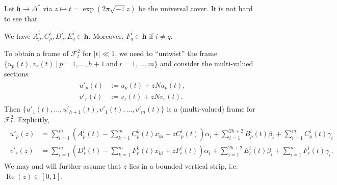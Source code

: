 Let \(\mathfrak{h}\to \Delta^{\ast}\) via \(z\mapsto t=\exp(2\pi\sqrt{-1}z)\) be the 
universal cover.
It is not hard to see that
\begin{lemma}
\label{lem:class-h}
We have \(A_{p}^{i},C_{p}^{i},D_{q}^{i},E_{q}^{i}\in\mathbf{h}\). Moreover,
\(F_{q}^{i}\in\mathbf{h}\) if \(i\ne q\).
\end{lemma}


To obtain a frame of \(\mathcal{F}_{t}^{2}\) for \(|t|\ll 1\), we need to ``untwist''
the frame 
\(\{u_{p}(t),v_{r}(t)~|~p=1,\ldots,h+1~\mbox{and}~r=1,\ldots,m\}\)
and consider
the multi-valued sections
\begin{align}
\begin{split}
u'_{p}(t)&:=u_{p}(t)+zNu_{p}(t),\\
v'_{r}(t)&:=v_{r}(t)+zNv_{r}(t).
\end{split}
\end{align}
Then \(\{u'_{1}(t),\ldots,u'_{h+1}(t),
v'_{1}(t),\ldots,v'_{m}(t)\}\) is a (multi-valued) frame for \(\mathcal{F}^{2}_{t}\). Explicitly,
\begin{align}
\label{eq:basis-for-f2}
\begin{split}
u'_{p}(z)&=\sum_{i=1}^{m} \left(A^{i}_{p}(t)-\sum_{k=1}^{m}C_{p}^{k}(t)x_{ki}
+zC_{p}^{i}(t)\right) \alpha_{i}+
\sum_{i=1}^{2h+2} B^{i}_{p}(t) \beta_{i} + \sum_{i=1}^{m} C^{i}_{p}(t) \gamma_{i}\\
v'_{r}(z)&=\sum_{i=1}^{m} \left(D^{i}_{r}(t)-\sum_{k=1}^{m}F_{r}^{k}(t)x_{ki}
+zF_{r}^{i}(t)\right) \alpha_{i}+
\sum_{i=1}^{2h+2} E^{i}_{r}(t) \beta_{i} + \sum_{i=1}^{m} F^{i}_{r}(t) \gamma_{i}.
\end{split}
\end{align} 
We may and will further assume that 
\(z\) lies in a bounded vertical strip, i.e.~
\(\operatorname{Re}(z)\in[0,1]\).

